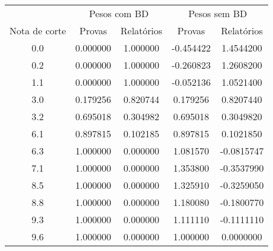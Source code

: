 \begin{tabular}{c cccc}
        \hline
                      & \multicolumn{2}{c}{Pesos com BD}
                      & \multicolumn{2}{c}{Pesos sem BD} \\ \cline{2-5}
        Nota de corte & Provas & Relatórios & Provas & Relatórios \\
        \hline
        0.0  & 0.000000 & 1.000000 & -0.454422 &  1.4544200  \\
        0.2  & 0.000000 & 1.000000 & -0.260823 &  1.2608200  \\
        1.1  & 0.000000 & 1.000000 & -0.052136 &  1.0521400  \\
        \rowcolor{lightgray}
        3.0  & 0.179256 & 0.820744 &  0.179256 &  0.8207440  \\ \rowcolor{lightgray}
        3.2  & 0.695018 & 0.304982 &  0.695018 &  0.3049820  \\ \rowcolor{lightgray}
        6.1  & 0.897815 & 0.102185 &  0.897815 &  0.1021850  \\
        6.3  & 1.000000 & 0.000000 &  1.081570 & -0.0815747  \\
        7.1  & 1.000000 & 0.000000 &  1.353800 & -0.3537990  \\
        8.5  & 1.000000 & 0.000000 &  1.325910 & -0.3259050  \\
        8.8  & 1.000000 & 0.000000 &  1.180080 & -0.1800770  \\
        9.3  & 1.000000 & 0.000000 &  1.111110 & -0.1111110  \\
        9.6  & 1.000000 & 0.000000 &  1.000000 &  0.0000000  \\
        \hline
\end{tabular}
